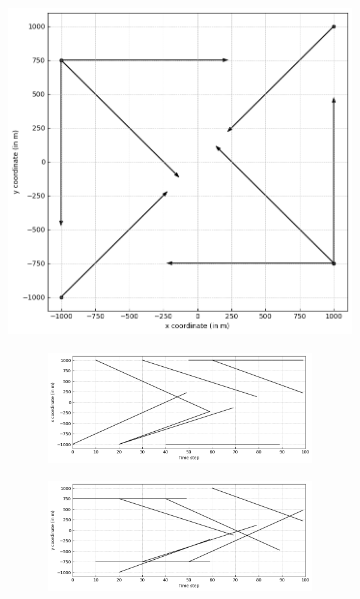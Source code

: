 \begin{figure}
    \centering
    \begin{subfigure}[]{0.48\linewidth}
        \centering
        \includegraphics[width=\linewidth]{figures/c3-tracks.png}
    \end{subfigure}
    \hfill
    \begin{subfigure}[]{0.48\linewidth}
        \centering
        \begin{subfigure}[t]{\linewidth}
            \includegraphics[width=\linewidth]{figures/c3-coord-x.png}
        \end{subfigure}
        \vfill\par
        \begin{subfigure}[b]{\linewidth}
            \includegraphics[width=\linewidth]{figures/c3-coord-y.png}

\end{subfigure}
\end{subfigure}
\end{figure}
